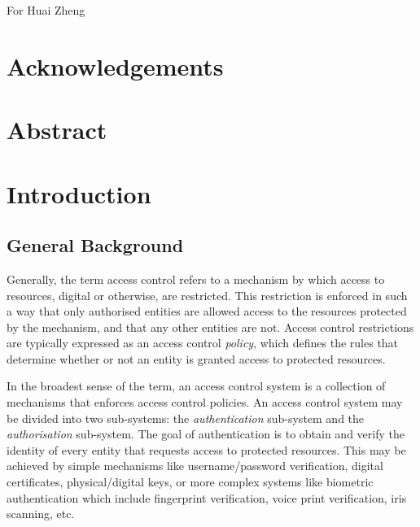 \documentclass[11pt]{report}
\newenvironment{vdedication}
{
  \thispagestyle{empty}
  \vspace*{\stretch{2}}
  \em
  \begin{center}
}
{
  \end{center}
  \vspace*{\stretch{10}}
  \cleardoublepage
}
\begin{document}
  \begin{vdedication}
    For Huai Zheng
  \end{vdedication}

  \chapter*{Acknowledgements}

  \chapter*{Abstract}

  \tableofcontents
  \listoffigures
  \listoftables
  \newpage


  \chapter{Introduction}
    \label{chap-intro}

    \section{General Background}
      \label{sect-intro-genbg}

      Generally, the term access control refers to a mechanism by which access
      to resources, digital or otherwise, are restricted. This restriction is
      enforced in such a way that only authorised entities are allowed access
      to the resources protected by the mechanism, and that any other entities
      are not. Access control restrictions are typically expressed as an
      access control {\em policy}, which defines the rules that determine
      whether or not an entity is granted access to protected resources.

      In the broadest sense of the term, an access control system is a
      collection of mechanisms that enforces access control policies. An access
      control system may be divided into two sub-systems: the
      {\em authentication} sub-system and the {\em authorisation} sub-system.
      The goal of authentication is to obtain and verify the identity of every
      entity that requests access to protected resources. This may be achieved
      by simple mechanisms like username/password verification, digital
      certificates, physical/digital keys, or more complex systems like
      biometric authentication which include fingerprint verification, voice
      print verification, iris scanning, etc.
\end{document}
